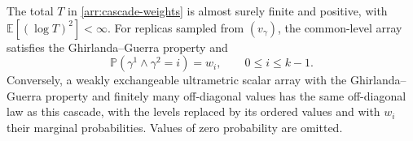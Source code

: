 \begin{lemma}
\label{arr:cascade}
The total $T$ in \eqref{arr:cascade-weights} is almost surely finite and
positive, with $\mathbb E[(\log T)^2]<\infty$.  For replicas sampled from
$(v_\gamma)$, the common-level array satisfies the Ghirlanda--Guerra
property and
\begin{equation}
 \mathbb P(\gamma^1\wedge\gamma^2=i)=w_i,
 \qquad 0\leq i\leq k-1.
 \label{arr:level-marginal}
\end{equation}
Conversely, a weakly exchangeable ultrametric scalar array with the
Ghirlanda--Guerra property and finitely many off-diagonal values has the
same off-diagonal law as this cascade, with the levels replaced by its
ordered values and with $w_i$ their marginal probabilities.  Values of
zero probability are omitted.
\end{lemma}

